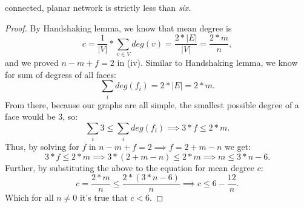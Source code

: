 \documentclass[12pt,a4paper,oneside,draft]{article}
\begin{document}
\begin{enumerate}
\begin{itemize}
      connected, planar network is strictly less than \textit{six}.
      \newline
      \begin{proof}
        By Handshaking lemma, we know that mean degree is
          $$c = \frac{1}{|V|} * \sum_{v \in V} deg(v) = \frac{2 * |E|}{|V|} = \frac{2 * m}{n},$$
        and we proved $n - m + f = 2$ in (iv).
        \newline
        Similar to Handshaking lemma, we know for sum of degress of all faces:
          $$\sum_{i} deg(f_i) = 2 * |E| = 2 * m.$$
        From there, because our graphs are all simple, the smallest possible degree of a face
        would be $3$, so:
          $$\sum_{i} 3 \leq \sum_{i} deg(f_i) \implies 3 * f \leq 2 * m.$$
        Thus, by solving for $f$ in $n - m + f = 2 \implies f = 2 + m - n$ we get:
          $$3 * f \leq 2 * m \implies 3 * (2 + m - n) \leq 2 * m \implies m \leq 3*n - 6.$$
        Further, by substituting the above to the equation for mean degree $c$:
          $$c = \frac{2 * m}{n} \leq \frac{2*(3*n - 6)}{n} \implies c \leq 6 - \frac{12}{n}.$$
        Which for all $n \neq 0$ it's true that $c < 6.$
      \end{proof}
    \end{itemize}
\end{enumerate}
\end{document}

